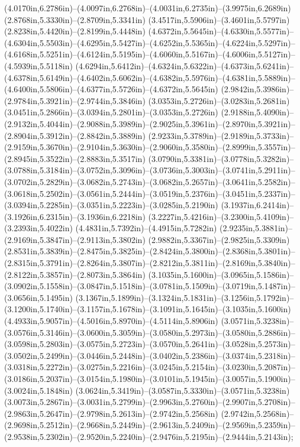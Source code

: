 (4.0170in,6.2786in)--(4.0097in,6.2768in)--(4.0031in,6.2735in)--(3.9975in,6.2689in) (2.8768in,5.3330in)--(2.8709in,5.3341in) (3.4517in,5.5906in)--(3.4601in,5.5797in) (2.8238in,5.4420in)--(2.8199in,5.4448in) (4.6372in,5.5645in)--(4.6330in,5.5577in)--(4.6304in,5.5503in)--(4.6295in,5.5427in)--(4.6252in,5.5365in)--(4.6224in,5.5297in)--(4.6168in,5.5251in)--(4.6124in,5.5195in)--(4.6060in,5.5167in)--(4.6006in,5.5127in)--(4.5939in,5.5118in) (4.6294in,5.6412in)--(4.6324in,5.6322in)--(4.6373in,5.6241in)--(4.6378in,5.6149in)--(4.6402in,5.6062in)--(4.6382in,5.5976in)--(4.6381in,5.5889in)--(4.6400in,5.5806in)--(4.6377in,5.5726in)--(4.6372in,5.5645in) (2.9842in,5.3986in)--(2.9784in,5.3921in)--(2.9744in,5.3846in) (3.0353in,5.2726in)--(3.0283in,5.2681in) (3.0451in,5.2866in)--(3.0394in,5.2801in)--(3.0353in,5.2726in) (2.9188in,5.4090in)--(2.9132in,5.4044in)--(2.9088in,5.3989in)--(2.9025in,5.3961in)--(2.8970in,5.3921in)--(2.8904in,5.3912in)--(2.8842in,5.3889in) (2.9233in,5.3789in)--(2.9189in,5.3733in)--(2.9159in,5.3670in)--(2.9104in,5.3630in)--(2.9060in,5.3580in)--(2.8999in,5.3557in)--(2.8945in,5.3522in)--(2.8883in,5.3517in) (3.0790in,5.3381in)--(3.0778in,5.3282in)--(3.0788in,5.3184in)--(3.0752in,5.3096in)--(3.0736in,5.3003in)--(3.0741in,5.2911in)--(3.0702in,5.2829in)--(3.0682in,5.2743in)--(3.0682in,5.2657in)--(3.0641in,5.2582in)--(3.0618in,5.2502in)--(3.0561in,5.2444in)--(3.0519in,5.2376in)--(3.0451in,5.2337in)--(3.0394in,5.2285in)--(3.0351in,5.2223in)--(3.0285in,5.2190in) (3.1937in,6.2414in)--(3.1926in,6.2315in)--(3.1936in,6.2218in) (3.2227in,5.4216in)--(3.2300in,5.4109in)--(3.2393in,5.4022in) (4.4831in,5.7392in)--(4.4915in,5.7282in) (2.9235in,5.3881in)--(2.9169in,5.3847in)--(2.9113in,5.3802in) (2.9882in,5.3367in)--(2.9825in,5.3309in) (2.8531in,5.3839in)--(2.8475in,5.3825in)--(2.8424in,5.3800in)--(2.8368in,5.3801in)--(2.8315in,5.3791in)--(2.8264in,5.3807in)--(2.8212in,5.3811in)--(2.8169in,5.3840in)--(2.8122in,5.3857in)--(2.8073in,5.3864in) (3.1035in,5.1600in)--(3.0965in,5.1586in)--(3.0902in,5.1558in)--(3.0847in,5.1518in)--(3.0781in,5.1509in)--(3.0719in,5.1487in)--(3.0656in,5.1495in) (3.1367in,5.1899in)--(3.1324in,5.1831in)--(3.1256in,5.1792in)--(3.1200in,5.1740in)--(3.1157in,5.1678in)--(3.1091in,5.1645in)--(3.1035in,5.1600in) (4.4933in,5.9057in)--(4.5016in,5.8970in)--(4.5114in,5.8906in) (3.0571in,5.3238in)--(3.0576in,5.3146in)--(3.0600in,5.3059in)--(3.0580in,5.2973in)--(3.0580in,5.2886in)--(3.0598in,5.2803in)--(3.0575in,5.2723in)--(3.0570in,5.2641in)--(3.0528in,5.2573in)--(3.0502in,5.2499in)--(3.0446in,5.2448in)--(3.0402in,5.2386in)--(3.0374in,5.2318in)--(3.0318in,5.2272in)--(3.0275in,5.2216in)--(3.0245in,5.2154in)--(3.0230in,5.2087in)--(3.0186in,5.2037in)--(3.0154in,5.1980in)--(3.0101in,5.1945in)--(3.0057in,5.1900in)--(3.0024in,5.1848in) (3.0624in,5.3419in)--(3.0587in,5.3330in)--(3.0571in,5.3238in) (3.0073in,5.2867in)--(3.0031in,5.2799in)--(2.9963in,5.2760in)--(2.9907in,5.2708in)--(2.9863in,5.2647in)--(2.9798in,5.2613in)--(2.9742in,5.2568in) (2.9742in,5.2568in)--(2.9698in,5.2512in)--(2.9668in,5.2449in)--(2.9613in,5.2409in)--(2.9569in,5.2359in)--(2.9538in,5.2302in)--(2.9520in,5.2240in)--(2.9476in,5.2195in)--(2.9444in,5.2143in);

